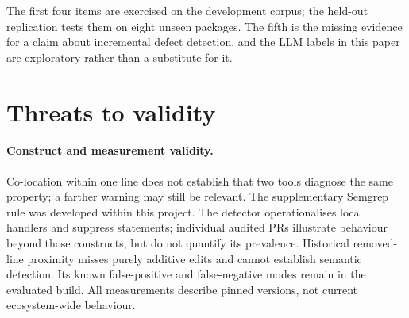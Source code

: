 \documentclass[10pt,a4paper]{article}
\begin{document}
\begin{center}
\end{center}

The first four items are exercised on the development corpus; the held-out
replication tests them on eight unseen packages. The fifth is the missing
evidence for a claim about incremental defect detection, and the LLM labels
in this paper are exploratory rather than a substitute for it.

\section{Threats to validity}
\label{sec:threats}

\paragraph{Construct and measurement validity.}
Co-location within one line does not establish that two tools diagnose the
same property; a farther warning may still be relevant. The supplementary
Semgrep rule was developed within this project. The detector operationalises
local handlers and suppress statements; individual audited PRs illustrate
behaviour beyond those constructs, but do not quantify its prevalence.
Historical removed-line proximity misses purely additive edits and cannot
establish semantic detection. Its known false-positive and
false-negative modes remain in the evaluated build. All measurements
describe pinned versions, not current ecosystem-wide behaviour.
\end{document}
